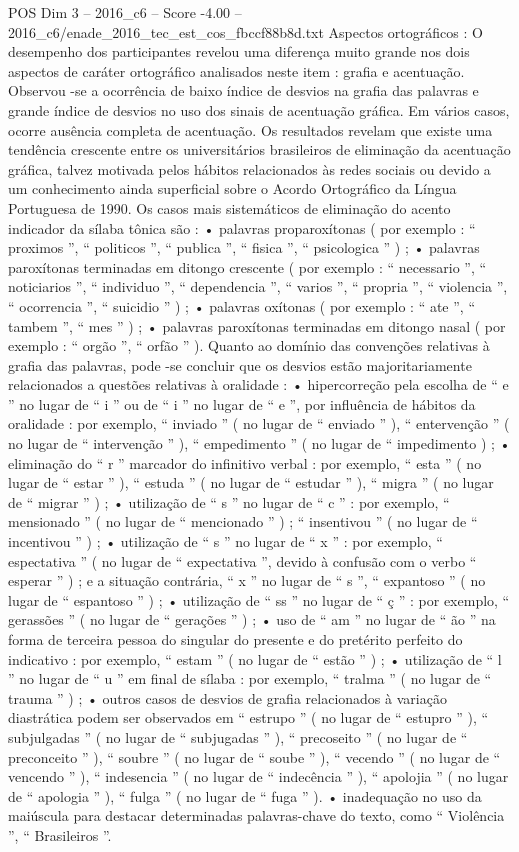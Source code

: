 \begin{textsample}{POS Dim 3 – 2016\_c6 – Score -4.00 – 2016\_c6/enade\_2016\_tec\_est\_cos\_fbccf88b8d.txt}
Aspectos ortográficos : O desempenho dos participantes revelou uma diferença muito grande nos dois aspectos de caráter ortográfico analisados neste item : grafia e acentuação.
Observou -se a ocorrência de baixo índice de desvios na grafia das palavras e grande índice de desvios no uso dos sinais de acentuação gráfica.
Em vários casos, ocorre ausência completa de acentuação.
Os resultados revelam que existe uma tendência crescente entre os universitários brasileiros de eliminação da acentuação gráfica, talvez motivada pelos hábitos relacionados às redes sociais ou devido a um conhecimento ainda superficial sobre o Acordo Ortográfico da Língua Portuguesa de 1990.
Os casos mais sistemáticos de eliminação do acento indicador da sílaba tônica são : • palavras proparoxítonas ( por exemplo : “ proximos ”, “ politicos ”, “ publica ”, “ fisica ”, “ psicologica ” ) ; • palavras paroxítonas terminadas em ditongo crescente ( por exemplo : “ necessario ”, “ noticiarios ”, “ individuo ”, “ dependencia ”, “ varios ”, “ propria ”, “ violencia ”, “ ocorrencia ”, “ suicidio ” ) ; • palavras oxítonas ( por exemplo : “ ate ”, “ tambem ”, “ mes ” ) ; • palavras paroxítonas terminadas em ditongo nasal ( por exemplo : “ orgão ”, “ orfão ” ).
Quanto ao domínio das convenções relativas à grafia das palavras, pode -se concluir que os desvios estão majoritariamente relacionados a questões relativas à oralidade : • hipercorreção pela escolha de “ e ” no lugar de “ i ” ou de “ i ” no lugar de “ e ”, por influência de hábitos da oralidade : por exemplo, “ inviado ” ( no lugar de “ enviado ” ), “ entervenção ” ( no lugar de “ intervenção ” ), “ empedimento ” ( no lugar de “ impedimento ) ; • eliminação do “ r ” marcador do infinitivo verbal : por exemplo, “ esta ” ( no lugar de “ estar ” ), “ estuda ” ( no lugar de “ estudar ” ), “ migra ” ( no lugar de “ migrar ” ) ; • utilização de “ s ” no lugar de “ c ” : por exemplo, “ mensionado ” ( no lugar de “ mencionado ” ) ; “ insentivou ” ( no lugar de “ incentivou ” ) ; • utilização de “ s ” no lugar de “ x ” : por exemplo, “ espectativa ” ( no lugar de “ expectativa ”, devido à confusão com o verbo “ esperar ” ) ; e a situação contrária, “ x ” no lugar de “ s ”, “ expantoso ” ( no lugar de “ espantoso ” ) ; • utilização de “ ss ” no lugar de “ ç ” : por exemplo, “ gerassões ” ( no lugar de “ gerações ” ) ; • uso de “ am ” no lugar de “ ão ” na forma de terceira pessoa do singular do presente e do pretérito perfeito do indicativo : por exemplo, “ estam ” ( no lugar de “ estão ” ) ; • utilização de “ l ” no lugar de “ u ” em final de sílaba : por exemplo, “ tralma ” ( no lugar de “ trauma ” ) ; • outros casos de desvios de grafia relacionados à variação diastrática podem ser observados em “ estrupo ” ( no lugar de “ estupro ” ), “ subjulgadas ” ( no lugar de “ subjugadas ” ), “ precoseito ” ( no lugar de “ preconceito ” ), “ soubre ” ( no lugar de “ soube ” ), “ vecendo ” ( no lugar de “ vencendo ” ), “ indesencia ” ( no lugar de “ indecência ” ), “ apolojia ” ( no lugar de “ apologia ” ), “ fulga ” ( no lugar de “ fuga ” ). • inadequação no uso da maiúscula para destacar determinadas palavras-chave do texto, como “ Violência ”, “ Brasileiros ”.

\end{textsample}
